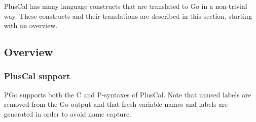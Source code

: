 PlusCal has many language constructs that are translated to Go in a non-trivial way. These constructs and their translations are described in this section, starting with an overview.

\subsection{Overview}

\subsubsection{PlusCal support}

PGo supports both the C and P-syntaxes of PlusCal. Note that unused labels are removed from the Go output and that fresh variable names and labels are generated in order to avoid name capture.

